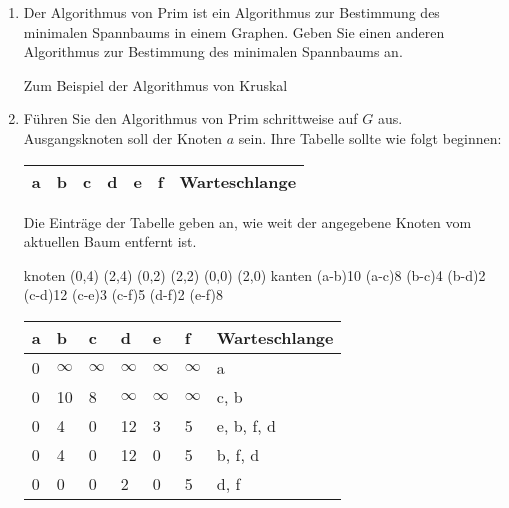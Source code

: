 \documentclass{lehramt-informatik-aufgabe}
\begin{document}
\begin{enumerate}


\item Der Algorithmus von Prim ist ein Algorithmus zur Bestimmung des
minimalen Spannbaums in einem Graphen. Geben Sie einen anderen
Algorithmus zur Bestimmung des minimalen Spannbaums an.

\begin{antwort}
Zum Beispiel der Algorithmus von Kruskal
\end{antwort}


\item Führen Sie den Algorithmus von Prim schrittweise auf $G$ aus.
Ausgangsknoten soll der Knoten $a$ sein. Ihre Tabelle sollte wie folgt
beginnen:

\begin{tabular}{|l|l|l|l|l|l|l|}
\hline
a &
b &
c &
d &
e &
f &
Warteschlange\\\hline
\end{tabular}

Die Einträge der Tabelle geben an, wie weit der angegebene Knoten
vom aktuellen Baum entfernt ist.

\begin{antwort}
\graph knoten {
  (0,4)
  (2,4)
  (0,2)
  (2,2)
  (0,0)
  (2,0)
} kanten {
  \kante(a-b){10}
  \KANTE(a-c){8}
  \KANTE(b-c){4}
  \KANTE(b-d){2}
  \kante(c-d){12}
  \KANTE(c-e){3}
  \kante(c-f){5}
  \KANTE(d-f){2}
  \kante(e-f){8}
}

\begin{tabular}{|l|l|l|l|l|l|l|}
\hline
a &
b &
c &
d &
e &
f &
Warteschlange\\\hline\hline

0 & %
$\infty$ & %
$\infty$ & %
$\infty$ & %
$\infty$ & %
$\infty$ & %
a \\\hline %

0 & %
10 & %
8 & %
$\infty$ & %
$\infty$ & %
$\infty$ & %
c, b\\\hline %

0 & %
4 & %
0 & %
12 & %
3 & %
5 & %
e, b, f, d\\\hline %

0 & %
4 & %
0 & %
12 & %
0 & %
5 & %
b, f, d \\\hline %

0 & %
0 & %
0 & %
2 & %
0 & %
5 & %
d, f \\\hline %


\end{tabular}
\end{antwort}
\end{enumerate}
\end{document}
